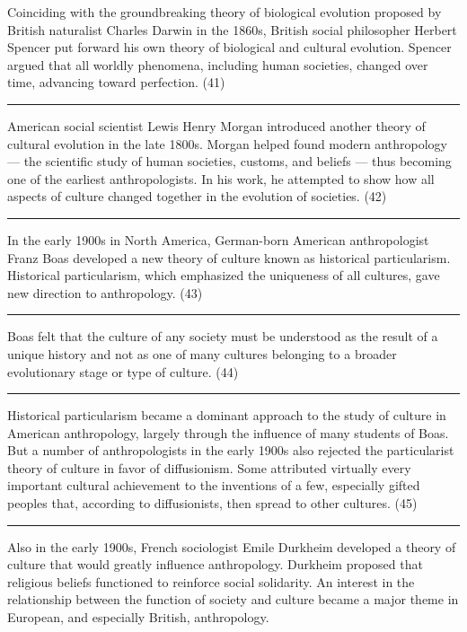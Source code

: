 \documentclass[UTF8,11pt]{ctexart}
\begin{document}
Coinciding with the groundbreaking theory of biological evolution proposed by British naturalist Charles Darwin in the 1860s, British social philosopher Herbert Spencer put forward his own theory of biological and cultural evolution. Spencer argued that all worldly phenomena, including human societies, changed over time, advancing toward perfection. (41) \par\noindent\rule{.95\linewidth}{.4pt}\par


American social scientist Lewis Henry Morgan introduced another theory of cultural evolution in the late 1800s. Morgan helped found modern anthropology — the scientific study of human societies, customs, and beliefs — thus becoming one of the earliest anthropologists. In his work, he attempted to show how all aspects of culture changed together in the evolution of societies. (42) \par\noindent\rule{.95\linewidth}{.4pt}\par


In the early 1900s in North America, German-born American anthropologist Franz Boas developed a new theory of culture known as historical particularism. Historical particularism, which emphasized the uniqueness of all cultures, gave new direction to anthropology. (43) \par\noindent\rule{.95\linewidth}{.4pt}\par


Boas felt that the culture of any society must be understood as the result of a unique history and not as one of many cultures belonging to a broader evolutionary stage or type of culture. (44) \par\noindent\rule{.95\linewidth}{.4pt}\par


Historical particularism became a dominant approach to the study of culture in American anthropology, largely through the influence of many students of Boas. But a number of anthropologists in the early 1900s also rejected the particularist theory of culture in favor of diffusionism. Some attributed virtually every important cultural achievement to the inventions of a few, especially gifted peoples that, according to diffusionists, then spread to other cultures. (45) \par\noindent\rule{.95\linewidth}{.4pt}\par


Also in the early 1900s, French sociologist Emile Durkheim developed a theory of culture that would greatly influence anthropology. Durkheim proposed that religious beliefs functioned to reinforce social solidarity. An interest in the relationship between the function of society and culture became a major theme in European, and especially British, anthropology.
\end{document}
